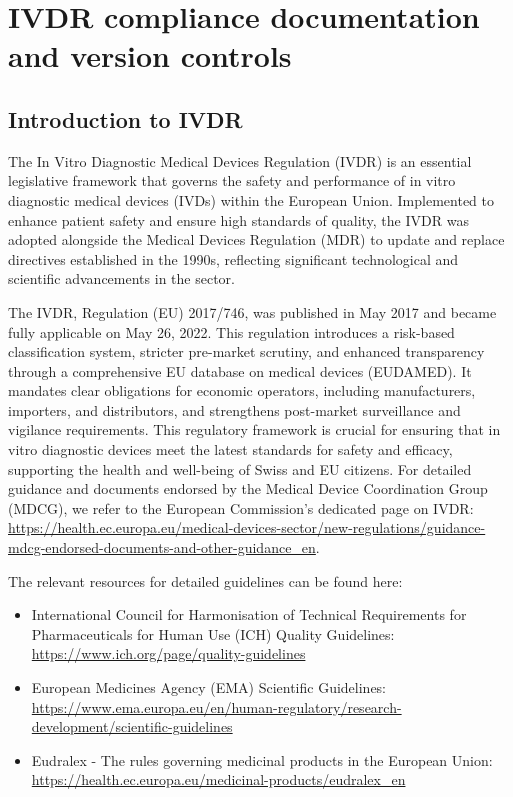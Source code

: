 \section{IVDR compliance documentation and version controls}

\subsection{Introduction to IVDR}

The In Vitro Diagnostic Medical Devices Regulation (IVDR) is an essential legislative framework that governs the safety and performance of in vitro diagnostic medical devices (IVDs) within the European Union. Implemented to enhance patient safety and ensure high standards of quality, the IVDR was adopted alongside the Medical Devices Regulation (MDR) to update and replace directives established in the 1990s, reflecting significant technological and scientific advancements in the sector.

The IVDR, Regulation (EU) 2017/746, was published in May 2017 and became fully applicable on May 26, 2022. This regulation introduces a risk-based classification system, stricter pre-market scrutiny, and enhanced transparency through a comprehensive EU database on medical devices (EUDAMED). It mandates clear obligations for economic operators, including manufacturers, importers, and distributors, and strengthens post-market surveillance and vigilance requirements. 
This regulatory framework is crucial for ensuring that in vitro diagnostic devices meet the latest standards for safety and efficacy, supporting the health and well-being of Swiss and EU citizens.
For detailed guidance and documents endorsed by the Medical Device Coordination Group (MDCG), we refer to the European Commission's dedicated page on IVDR: \url{https://health.ec.europa.eu/medical-devices-sector/new-regulations/guidance-mdcg-endorsed-documents-and-other-guidance_en}.

The relevant resources for detailed guidelines can be found here:
\begin{itemize}
    \item International Council for Harmonisation of Technical Requirements for Pharmaceuticals for Human Use (ICH) Quality Guidelines: \url{https://www.ich.org/page/quality-guidelines}
    \item European Medicines Agency (EMA) Scientific Guidelines: \url{https://www.ema.europa.eu/en/human-regulatory/research-development/scientific-guidelines}
    \item Eudralex - The rules governing medicinal products in the European Union: \url{https://health.ec.europa.eu/medicinal-products/eudralex_en}
\end{itemize}

